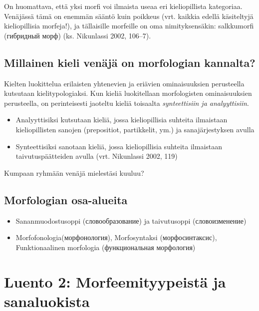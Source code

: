 \documentclass[]{scrartcl}
\providecommand{\tightlist}{%
  \setlength{\itemsep}{0pt}\setlength{\parskip}{0pt}}
\begin{document}
On huomattava, että yksi morfi voi ilmaista useaa eri kieliopillista
kategoriaa. Venäjässä tämä on enemmän sääntö kuin poikkeus (vrt. kaikkia
edellä käsiteltyjä kieliopillisia morfeja!), ja tällaisille morfeille on
oma nimityksensäkin: salkkumorfi (гибридный морф) (ks. Nikunlassi 2002,
106--7).

\subsection{Millainen kieli venäjä on morfologian
kannalta?}\label{millainen-kieli-venuxe4juxe4-on-morfologian-kannalta}

Kielten luokittelua erilaisten yhtenevien ja eriävien ominaisuuksien
perusteella kutsutaan kielitypologiaksi. Kun kieliä luokitellaan
morfologisten ominaisuuksien perusteella, on perinteisesti jaoteltu
kieliä toisaalta \emph{synteettisiin ja analyyttisiin}.

\begin{itemize}
\tightlist
\item
  Analyyttisiksi kutsutaan kieliä, jossa kieliopillisia suhteita
  ilmaistaan kieliopillisten sanojen (prepositiot, partikkelit, ym.) ja
  sanajärjestyksen avulla
\item
  Synteettisiksi sanotaan kieliä, jossa kieliopillisia suhteita
  ilmaistaan taivutuspäätteiden avulla (vrt. Nikunlassi 2002, 119)
\end{itemize}

Kumpaan ryhmään venäjä mielestäsi kuuluu?

\subsection{Morfologian osa-alueita}\label{morfologian-osa-alueita}

\begin{itemize}
\item
  Sananmuodostusoppi (словообразование) ja taivutusoppi (словоизменение)
\item
  Morfofonologia(морфонология), Morfosyntaksi (морфосинтаксис),
  Funktionaalinen morfologia (функциональная морфология)
\end{itemize}

\section{Luento 2: Morfeemityypeistä ja
sanaluokista}\label{luento-2-morfeemityypeistuxe4-ja-sanaluokista}
\end{document}
